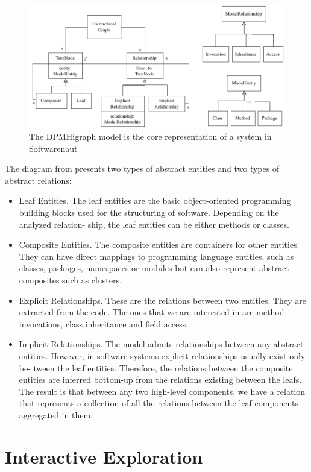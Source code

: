 \documentclass[preprint,12pt]{elsarticle}
\begin{document}
\begin{figure}[h]
\begin{center}
\includegraphics[width=0.7\linewidth]{images/HigraphModel}
\caption{The DPMHigraph model is the core representation of a system in Softwarenaut}
\end{center}
\end{figure}


The diagram from  presents two types of abstract entities and two types of abstract relations:
\begin{itemize}
\item Leaf Entities. The leaf entities are the basic object-oriented programming building blocks used for the structuring of software. Depending on the analyzed relation- ship, the leaf entities can be either methods or classes.
\item Composite Entities. The composite entities are containers for other entities. They can have direct mappings to programming language entities, such as classes, packages, namespaces or modules but can also represent abstract composites such as clusters.
\item Explicit Relationships. These are the relations between two entities. They are extracted from the code. The ones that we are interested in are method invocations, class inheritance and field access.
\item Implicit Relationships. The model admits relationships between any abstract entities. However, in software systems explicit relationships usually exist only be- tween the leaf entities. Therefore, the relations between the composite entities are inferred bottom-up from the relations existing between the leafs. The result is that between any two high-level components, we have a relation that represents a collection of all the relations between the leaf components aggregated in them.
\end{itemize}




\section {Interactive Exploration}
\label {sec:interact}
\end{document}
